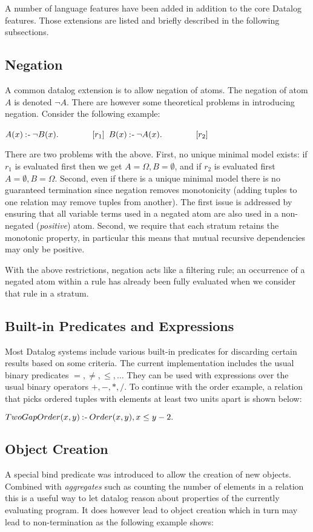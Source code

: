 A number of language features have been added in addition to the core Datalog features. Those extensions are listed and briefly described in the following subsections.
\subsection{Negation}
A common datalog extension is to allow negation of atoms. The negation of atom $A$ is denoted $\neg A$. There are however some theoretical problems in introducing negation. Consider the following example:

\NL
{\centering
	$A(x) \mathbin{:\hspace{-0.5ex}\textsf{-}} \neg B(x).\qquad\qquad[r_1]$ \NL
	$B(x) \mathbin{:\hspace{-0.5ex}\textsf{-}} \neg A(x).\qquad\qquad[r_2]$\par
}

\NL
There are two problems with the above. First, no unique minimal model exists: if $r_1$ is evaluated first then we get $A = \Omega, B = \emptyset$, and if $r_2$ is evaluated first $A = \emptyset, B = \Omega$. Second, even if there is a unique minimal model there is no guaranteed termination since negation removes monotonicity (adding tuples to one relation may remove tuples from another). The first issue is addressed by ensuring that all variable terms used in a negated atom are also used in a non-negated (\textit{positive}) atom. Second, we require that each stratum retains the monotonic property, in particular this means that mutual recursive dependencies may only be positive.

With the above restrictions, negation acts like a filtering rule; an occurrence of a negated atom within a rule has already been fully evaluated when we consider that rule in a stratum.
\subsection{Built-in Predicates and Expressions}
Most Datalog systems include various built-in predicates for discarding certain results based on some criteria. The current implementation includes the usual binary predicates $=, \neq, \leq, \ldots$ They can be used with expressions over the usual binary operators $+,-,*,/$. To continue with the order example, a relation that picks ordered tuples with elements at least two units apart is shown below:

\NL
{\centering
	$TwoGapOrder(x, y) \mathbin{:\hspace{-0.5ex}\textsf{-}} Order(x, y), x \leq y - 2.$ \NL
}
\subsection{Object Creation}
A special bind predicate was introduced to allow the creation of new objects. Combined with \textit{aggregates} such as counting the number of elements in a relation this is a useful way to let datalog reason about properties of the currently evaluating program. It does however lead to object creation which in turn may lead to non-termination as the following example shows:

